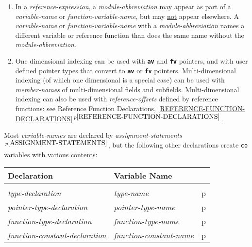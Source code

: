 \documentclass[12pt]{article}
\newcommand{\TT}[1]{{\tt \bfseries #1}}
\newcommand{\itemref}[1]{\ref{#1}$\,^{p\pageref{#1}}$}
\newcommand{\pagref}[1]{p\pageref{#1}}
\newcommand{\pagnote}[1]{$\,^{p\pageref{#1}}$}
\newenvironment{indpar}[1][0.3in]%
	{\begin{list}{}%
		     {\setlength{\itemsep}{0in}%
		      \setlength{\topsep}{0in}%
		      \setlength{\parsep}{1ex}%
		      \setlength{\labelwidth}{#1}%
		      \setlength{\leftmargin}{#1}%
		      \addtolength{\leftmargin}{\labelsep}}%
	 \item}%
	{\end{list}}
\begin{document}
\begin{indpar}
\begin{enumerate}
Otherwise an {\em expression} with no operators is one of:
\begin{enumerate}
\item a {\em block-variable-declaration}\pagnote{BLOCK-VARIABLE-DECLARATION},
or
\item a {\em constant}\pagnote{CONSTANT}
other than a {\em rational-constant}, or
\item
a (non-reference) {\em function-call}\pagnote{FUNCTION-CALL}, or
\item
an explicitly bracketed subexpression or an implicitly
parenthesized subexpression, or
\item
an explicitly parenthesized subexpression
preceded by a {\em module-abbreviation}
(see \pagref{MA-SYNTACTIC-SUGAR} for more information about this last case)
\end{enumerate}
\item In a {\em reference-expression},
a {\em module-abbreviation} may appear as part of a
{\em variable-name} or {\em function-variable-name},
but may \underline{not} appear elsewhere.
A {\em variable-name} or {\em function-variable-name}
with a {\em module-abbreviation}
names a different variable or reference function than does the same
name without the {\em module-abbreviation}.
\item
One dimensional indexing can be used with \TT{av} and \TT{fv} pointers,
and with user defined pointer types that convert to \TT{av} or \TT{fv}
pointers.
Multi-dimensional indexing (of which one dimensional is a special
case) can be used with {\em member-names}
of multi-dimensional fields and subfields.  Multi-dimensional indexing
can also be used with {\em reference-offsets} defined by
reference functions: see Reference Function Declarations,
\itemref{REFERENCE-FUNCTION-DECLARATIONS}.

\end{enumerate}
\end{indpar}

Most {\em variable-names} are declared by
{\em assignment-statements}\pagnote{ASSIGNMENT-STATEMENTS}, but
the following other declarations create {\tt co} variables
with various contents:
\begin{center}
\begin{tabular}{l@{~~~~}l@{~~~~}l}
\bf Declaration & \bf Variable Name &
\\\hline
\\[1ex]
{\em type-declaration} & {\em type-name} & \pagref{TYPE-DECLARATIONS} \\
{\em pointer-type-declaration} & {\em pointer-type-name}
                               & \pagref{POINTER-TYPE-DECLARATIONS} \\
{\em function-type-declaration} & {\em function-type-name}
                               & \pagref{FUNCTION-TYPE-DECLARATIONS} \\
{\em function-constant-declaration} & {\em function-constant-name}
                               & \pagref{FUNCTION-CONSTANT-DECLARATION} \\
\end{tabular}
\end{center}
\end{document}

